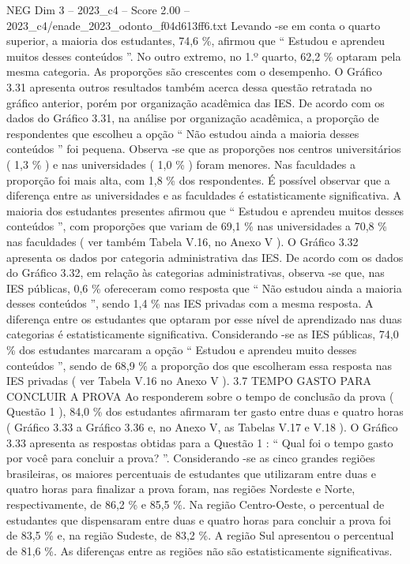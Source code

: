 \begin{textsample}{NEG Dim 3 – 2023\_c4 – Score 2.00 – 2023\_c4/enade\_2023\_odonto\_f04d613ff6.txt}
Levando -se em conta o quarto superior, a maioria dos estudantes, 74,6 \%, afirmou que “ Estudou e aprendeu muitos desses conteúdos ”.
No outro extremo, no 1.º quarto, 62,2 \% optaram pela mesma categoria.
As proporções são crescentes com o desempenho.
O Gráfico 3.31 apresenta outros resultados também acerca dessa questão retratada no gráfico anterior, porém por organização acadêmica das IES.
De acordo com os dados do Gráfico 3.31, na análise por organização acadêmica, a proporção de respondentes que escolheu a opção “ Não estudou ainda a maioria desses conteúdos ” foi pequena.
Observa -se que as proporções nos centros universitários ( 1,3 \% ) e nas universidades ( 1,0 \% ) foram menores.
Nas faculdades a proporção foi mais alta, com 1,8 \% dos respondentes.
É possível observar que a diferença entre as universidades e as faculdades é estatisticamente significativa.
A maioria dos estudantes presentes afirmou que “ Estudou e aprendeu muitos desses conteúdos ”, com proporções que variam de 69,1 \% nas universidades a 70,8 \% nas faculdades ( ver também Tabela V.16, no Anexo V ).
O Gráfico 3.32 apresenta os dados por categoria administrativa das IES.
De acordo com os dados do Gráfico 3.32, em relação às categorias administrativas, observa -se que, nas IES públicas, 0,6 \% ofereceram como resposta que “ Não estudou ainda a maioria desses conteúdos ”, sendo 1,4 \% nas IES privadas com a mesma resposta.
A diferença entre os estudantes que optaram por esse nível de aprendizado nas duas categorias é estatisticamente significativa.
Considerando -se as IES públicas, 74,0 \% dos estudantes marcaram a opção “ Estudou e aprendeu muito desses conteúdos ”, sendo de 68,9 \% a proporção dos que escolheram essa resposta nas IES privadas ( ver Tabela V.16 no Anexo V ). 3.7 TEMPO GASTO PARA CONCLUIR A PROVA Ao responderem sobre o tempo de conclusão da prova ( Questão 1 ), 84,0 \% dos estudantes afirmaram ter gasto entre duas e quatro horas ( Gráfico 3.33 a Gráfico 3.36 e, no Anexo V, as Tabelas V.17 e V.18 ).
O Gráfico 3.33 apresenta as respostas obtidas para a Questão 1 : “ Qual foi o tempo gasto por você para concluir a prova? ”.
Considerando -se as cinco grandes regiões brasileiras, os maiores percentuais de estudantes que utilizaram entre duas e quatro horas para finalizar a prova foram, nas regiões Nordeste e Norte, respectivamente, de 86,2 \% e 85,5 \%.
Na região Centro-Oeste, o percentual de estudantes que dispensaram entre duas e quatro horas para concluir a prova foi de 83,5 \% e, na região Sudeste, de 83,2 \%.
A região Sul apresentou o percentual de 81,6 \%.
As diferenças entre as regiões não são estatisticamente significativas.

\end{textsample}
